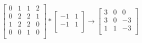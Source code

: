 \[
\left[
\begin{array}{cccc}
0 & 1 & 1 & 2 \\
0 & 2 & 2 & 1 \\
1 & 2 & 2 & 0 \\
0 & 0 & 1 & 0 \\
\end{array}
\right]
\ast
\left[
\begin{array}{cc}
-1 & 1 \\
-1 & 1 \\
\end{array}
\right]
\longrightarrow
\left[
\begin{array}{ccc}
3 & 0 & 0  \\
3 & 0 & -3 \\
1 & 1 & -3 \\
\end{array}
\right]
\]